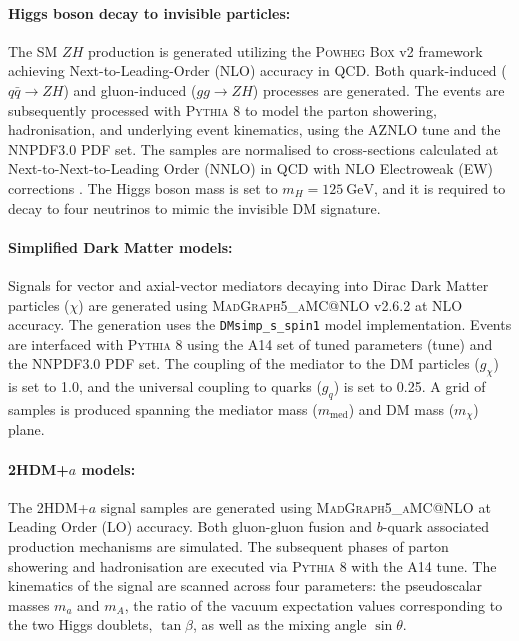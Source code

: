 \paragraph{\textbf{Higgs boson decay to invisible particles:}}
The SM $ZH$ production is generated utilizing the \textsc{Powheg Box} v2 framework \cite{Nason:2009xu} achieving Next-to-Leading-Order (NLO) accuracy in QCD. Both quark-induced ($q\bar{q} \to ZH$) and gluon-induced ($gg \to ZH$) processes are generated. The events are subsequently processed with \textsc{Pythia} 8 \cite{Sjostrand:2007gs} to model the parton showering, hadronisation, and underlying event kinematics, using the AZNLO tune and the NNPDF3.0 PDF set. The samples are normalised to cross-sections calculated at Next-to-Next-to-Leading Order (NNLO) in QCD with NLO Electroweak (EW) corrections \cite{deFlorian:2016spz}. The Higgs boson mass is set to $m_H = 125~\text{GeV}$, and it is required to decay to four neutrinos to mimic the invisible DM signature.

\paragraph{\textbf{Simplified Dark Matter models:}}
Signals for vector and axial-vector mediators decaying into Dirac Dark Matter particles ($\chi$) are generated using \textsc{MadGraph5\_aMC@NLO} v2.6.2 \cite{Alwall:2014hca} at NLO accuracy. The generation uses the \texttt{DMsimp\_s\_spin1} model implementation. Events are interfaced with \textsc{Pythia} 8 using the A14 set of tuned parameters (tune) and the NNPDF3.0 PDF set. The coupling of the mediator to the DM particles ($g_{\chi}$) is set to 1.0, and the universal coupling to quarks ($g_{q}$) is set to 0.25. A grid of samples is produced spanning the mediator mass ($m_{\text{med}}$) and DM mass ($m_{\chi}$) plane.

\paragraph{\textbf{2HDM+$a$ models:}}
The 2HDM+$a$ signal samples are generated using \textsc{MadGraph5\_aMC@NLO} \cite{Alwall:2014hca} at Leading Order (LO) accuracy. Both gluon-gluon fusion and $b$-quark associated production mechanisms are simulated. The subsequent phases of parton showering and hadronisation are executed via \textsc{Pythia} 8 with the A14 tune. The kinematics of the signal are scanned across four parameters: the pseudoscalar masses $m_a$ and $m_A$, the ratio of the vacuum expectation values corresponding to the two Higgs doublets, $\tan\beta$, as well as the mixing angle $\sin\theta$.

